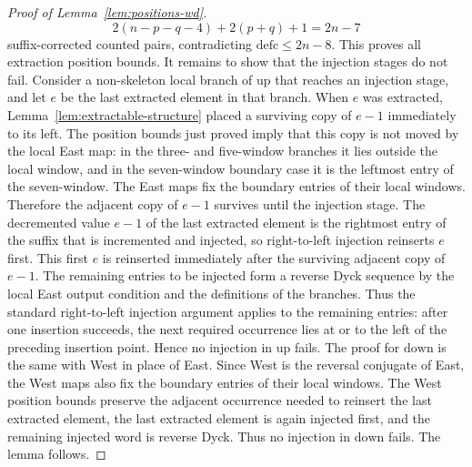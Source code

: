 \documentclass[11pt]{article}
\theoremstyle{plain}
\theoremstyle{definition}
\theoremstyle{remark}
\newcommand{\defc}{\mathrm{defc}}
\begin{document}
\begin{proof}[Proof of Lemma~\ref{lem:positions-wd}]
\[
  2(n-p-q-4)+2(p+q)+1=2n-7
\]
suffix-corrected counted pairs, contradicting \(\defc\le 2n-8\).  This proves
all extraction position bounds.
It remains to show that the injection stages do not fail.  Consider a
non-skeleton local branch of \(\mathrm{up}\) that reaches an injection stage,
and let \(e\) be the last extracted element in that branch.  When \(e\) was
extracted, Lemma~\ref{lem:extractable-structure} placed a surviving copy of
\(e-1\) immediately to its left.  The position bounds just proved imply that
this copy is not moved by the local East map: in the three- and five-window
branches it lies outside the local window, and in the seven-window boundary
case it is the leftmost entry of the seven-window.  The East maps fix the
boundary entries of their local windows.  Therefore the adjacent copy of
\(e-1\) survives until the injection stage.
The decremented value \(e-1\) of the last extracted element is the rightmost
entry of the suffix that is incremented and injected, so right-to-left
injection reinserts \(e\) first.  This first \(e\) is reinserted immediately
after the surviving adjacent copy of \(e-1\).  The remaining entries to be
injected form a
reverse Dyck sequence by the local East output condition and the definitions of
the branches.  Thus the standard right-to-left injection argument applies to
the remaining entries: after one insertion succeeds, the next required
occurrence lies at or to the left of the preceding insertion point.  Hence no
injection in \(\mathrm{up}\) fails.
The proof for \(\mathrm{down}\) is the same with West in place of East.
Since West is the reversal conjugate of East, the West maps also fix the
boundary entries of their local windows.  The West position bounds preserve the
adjacent occurrence needed to reinsert the last extracted element, the last
extracted element is again injected first, and the remaining injected word is
reverse Dyck.  Thus no injection in \(\mathrm{down}\) fails.  The lemma
follows.
\end{proof}
\end{document}
